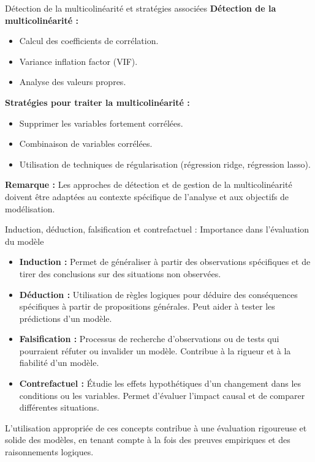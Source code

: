 \documentclass{beamer}
\begin{document}
\begin{frame}{Détection de la multicolinéarité et stratégies associées}
	\textbf{Détection de la multicolinéarité :}
	\begin{itemize}
		\item Calcul des coefficients de corrélation.
		\item Variance inflation factor (VIF).
		\item Analyse des valeurs propres.
	\end{itemize}
	
	\vfill
	
	\textbf{Stratégies pour traiter la multicolinéarité :}
	\begin{itemize}
		\item Supprimer les variables fortement corrélées.
		\item Combinaison de variables corrélées.
		\item Utilisation de techniques de régularisation (régression ridge, régression lasso).
	\end{itemize}
	
	\vfill
	
	\textbf{Remarque :} Les approches de détection et de gestion de la multicolinéarité doivent être adaptées au contexte spécifique de l'analyse et aux objectifs de modélisation.
\end{frame}


\begin{frame}{Induction, déduction, falsification et contrefactuel : Importance dans l'évaluation du modèle}
	\begin{itemize}
		\item \textbf{Induction :} Permet de généraliser à partir des observations spécifiques et de tirer des conclusions sur des situations non observées.
		\item \textbf{Déduction :} Utilisation de règles logiques pour déduire des conséquences spécifiques à partir de propositions générales. Peut aider à tester les prédictions d'un modèle.
		\item \textbf{Falsification :} Processus de recherche d'observations ou de tests qui pourraient réfuter ou invalider un modèle. Contribue à la rigueur et à la fiabilité d'un modèle.
		\item \textbf{Contrefactuel :} Étudie les effets hypothétiques d'un changement dans les conditions ou les variables. Permet d'évaluer l'impact causal et de comparer différentes situations.
	\end{itemize}
	
	\vfill
	
	L'utilisation appropriée de ces concepts contribue à une évaluation rigoureuse et solide des modèles, en tenant compte à la fois des preuves empiriques et des raisonnements logiques.
\end{frame}
\end{document}

